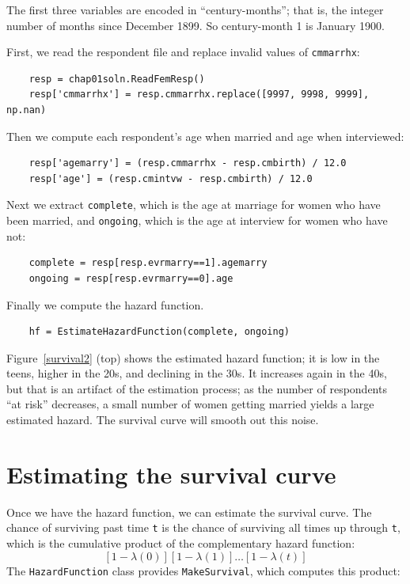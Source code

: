 \documentclass[12pt]{book}
\begin{document}
The first three variables are encoded in ``century-months''; that is, the
integer number of months since December 1899.  So century-month
1 is January 1900.

First, we read the respondent file and replace invalid values of
\verb"cmmarrhx":

\begin{verbatim}
    resp = chap01soln.ReadFemResp()
    resp['cmmarrhx'] = resp.cmmarrhx.replace([9997, 9998, 9999], np.nan)
\end{verbatim}

Then we compute each respondent's age when married and age when
interviewed:

\begin{verbatim}
    resp['agemarry'] = (resp.cmmarrhx - resp.cmbirth) / 12.0
    resp['age'] = (resp.cmintvw - resp.cmbirth) / 12.0
\end{verbatim}

Next we extract \verb"complete", which is the age at marriage for
women who have been married, and \verb"ongoing", which is the
age at interview for women who have not:

\begin{verbatim}
    complete = resp[resp.evrmarry==1].agemarry
    ongoing = resp[resp.evrmarry==0].age
\end{verbatim}

Finally we compute the
hazard function.

\begin{verbatim}
    hf = EstimateHazardFunction(complete, ongoing)
\end{verbatim}

Figure~\ref{survival2} (top) shows the estimated hazard function;
it is low in the teens,
higher in the 20s, and declining in the 30s.  It increases again in
the 40s, but that is an artifact of the estimation process; as the
number of respondents ``at risk'' decreases, a small number of
women getting married yields a large estimated hazard.  The survival
curve will smooth out this noise.


\section{Estimating the survival curve}

Once we have the hazard function, we can estimate the survival curve.
The chance of surviving past time \verb"t" is the chance of surviving
all times up through \verb"t", which is the cumulative product of
the complementary hazard function:
%
\[ [1-\lambda(0)] [1-\lambda(1)] \ldots [1-\lambda(t)] \]
%
The \verb"HazardFunction" class provides \verb"MakeSurvival", which
computes this product:
\end{document}
